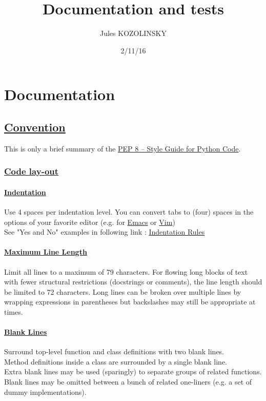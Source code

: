 \documentclass[a4paper]{report}
\title{\Huge Documentation and tests}
\author{Jules KOZOLINSKY}
\date{2/11/16}
\begin{document}
	\maketitle
	\tableofcontents
\chapter{Documentation}
\section{\href{https://www.python.org/dev/peps/pep-0008/}{Convention}}
This is only a brief summary of the \href{https://www.python.org/dev/peps/pep-0008/}{PEP 8 -- Style Guide for Python Code}.
\subsection{\href{https://www.python.org/dev/peps/pep-0008/\#code-lay-out}{Code lay-out}}
\subsubsection{\href{https://www.python.org/dev/peps/pep-0008/\#indentation}{Indentation}}
Use 4 spaces per indentation level. You can convert tabs to (four) spaces in the options of your favorite editor (e.g. for \href{https://www.gnu.org/software/emacs/manual/html_node/emacs/Just-Spaces.html}{Emacs} or \href{http://vim.wikia.com/wiki/Converting_tabs_to_spaces}{Vim})\\
See "Yes and No" examples in following link : \href{https://www.python.org/dev/peps/pep-0008/\#indentation}{Indentation Rules}
\subsubsection{\href{https://www.python.org/dev/peps/pep-0008/\#maximum-line-length}{Maximum Line Length}}
Limit all lines to a maximum of 79 characters. For flowing long blocks of text with fewer structural restrictions (docstrings or comments), the line length should be limited to 72 characters. Long lines can be broken over multiple lines by wrapping expressions in parentheses but backslashes may still be appropriate at times.
\subsubsection{\href{https://www.python.org/dev/peps/pep-0008/\#blank-lines}{Blank Lines}}
Surround top-level function and class definitions with two blank lines.\\
Method definitions inside a class are surrounded by a single blank line.\\
Extra blank lines may be used (sparingly) to separate groups of related functions. Blank lines may be omitted between a bunch of related one-liners (e.g. a set of dummy implementations).
\end{document}
